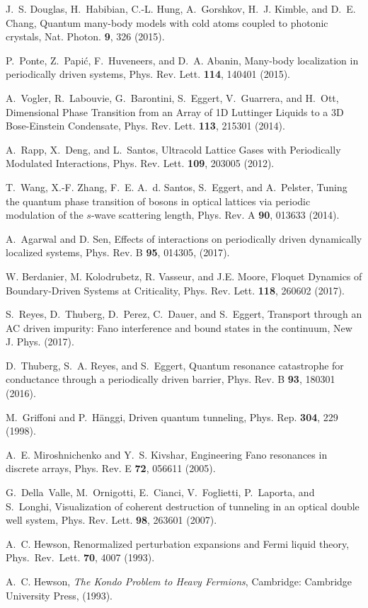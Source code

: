 \documentclass[aps,twocolumn,showpacs,floatfix,prl]{revtex4}
\begin{document}
\begin{thebibliography}{10}
J.~S. Douglas, H.~Habibian, C.-L. Hung, A.~Gorshkov, H.~J. Kimble, and D.~E.
  Chang, Quantum many-body models with cold atoms coupled to photonic crystals,
  Nat. Photon. {\bf 9}, 326 (2015).

P.~Ponte, Z.~Papi{\'c}, F.~Huveneers, and D.~A. Abanin, Many-body localization
  in periodically driven systems, Phys. Rev. Lett. {\bf 114}, 140401 (2015).

A.~Vogler, R.~Labouvie, G.~Barontini, S.~Eggert, V.~Guarrera, and H.~Ott,
  Dimensional Phase Transition from an Array of 1D Luttinger Liquids to a 3D
  Bose-Einstein Condensate, Phys. Rev. Lett. {\bf 113}, 215301 (2014).

A.~Rapp, X.~Deng, and L.~Santos, Ultracold Lattice Gases with Periodically
  Modulated Interactions, Phys. Rev. Lett. {\bf 109}, 203005 (2012).

T.~Wang, X.-F. Zhang, F.~E. A.~d. Santos, S.~Eggert, and A.~Pelster, Tuning the
  quantum phase transition of bosons in optical lattices via periodic
  modulation of the $s$-wave scattering length, Phys. Rev. A {\bf 90}, 013633
  (2014).

  A.~Agarwal and D. Sen, 
{Effects of interactions on periodically driven dynamically localized systems},
 {Phys. Rev. B} {\bf 95}, {014305}, ({2017}).

  {W. Berdanier, M. Kolodrubetz, R. Vasseur, and J.E. Moore,} 
  {Floquet Dynamics of Boundary-Driven Systems at Criticality},
  {Phys. Rev. Lett.}
  {\bf 118},
  {260602}
  (2017).


S.~Reyes, D.~Thuberg, D.~Perez, C.~Dauer, and S.~Eggert, Transport through an
  AC driven impurity: Fano interference and bound states in the continuum, New
  J. Phys.  (2017).

D.~Thuberg, S.~A. Reyes, and S.~Eggert, Quantum resonance catastrophe for
  conductance through a periodically driven barrier, Phys. Rev. B {\bf 93},
  180301 (2016).

M.~Griffoni and P.~H{\"a}nggi, Driven quantum tunneling, Phys. Rep. {\bf 304},
  229 (1998).


A.~E. Miroshnichenko and Y.~S. Kivshar, Engineering Fano resonances in discrete
  arrays, Phys. Rev. E {\bf 72}, 056611 (2005).

G.~Della~Valle, M.~Ornigotti, E.~Cianci, V.~Foglietti, P.~Laporta, and
  S.~Longhi, Visualization of coherent destruction of tunneling in an optical
  double well system, Phys. Rev. Lett. {\bf 98}, 263601 (2007).

A.~C. Hewson, Renormalized perturbation expansions and Fermi liquid theory,
  Phys.~Rev.~Lett. {\bf 70}, 4007 (1993).

A.~C. Hewson, {\it The {K}ondo {P}roblem to {H}eavy {F}ermions},
\newblock Cambridge: Cambridge University Press,  (1993).

\end{thebibliography}
\end{document}
